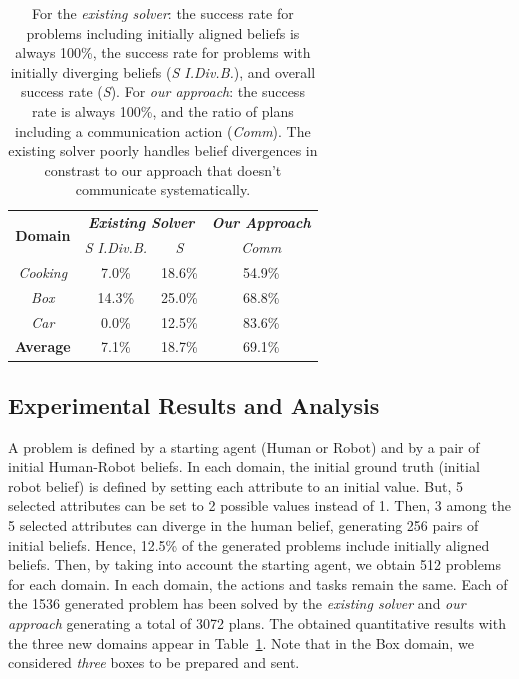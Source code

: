 \documentclass[letterpaper]{article} %
\begin{document}
\begin{table}
    \begin{adjustbox}{width=0.77\columnwidth,center}
    \begin{tabular}{@{}c|c c| c@{}}
        \multirow{2}{*}{\textbf{Domain}} & \multicolumn{2}{c|}{\textbf{\textit{Existing Solver}}} & \multicolumn{1}{c}{\textbf{\textit{Our Approach}}}
        \\
        & \multicolumn{1}{c}{\textit{S I.Div.B.}} & \multicolumn{1}{c|}{\textit{S}} & \multicolumn{1}{c}{\textit{Comm}} 
        \\ \cline{1-4}
        \textit{Cooking}    &  7.0\% & 18.6\% & 54.9\%\\
        \textit{Box}        & 14.3\% & 25.0\% & 68.8\%\\
        \textit{Car}        &  0.0\% & 12.5\% & 83.6\%\\
        \hline
        \textbf{Average}    &  7.1\% & 18.7\% & 69.1\%\\
    \end{tabular}
    \end{adjustbox}
    \caption
    {
    \label{tab:q_results}
    For the \textit{existing solver}: the success rate for problems including initially aligned beliefs is always 100\%, the success rate for problems with initially diverging beliefs (\textit{S I.Div.B.}), and overall success rate (\textit{S}). For \textit{our approach}: the success rate is always 100\%, and the ratio of plans including a communication action (\textit{Comm}). 
    The existing solver poorly handles belief divergences in constrast to our approach that doesn't communicate systematically.
    }
\end{table}

\subsection{Experimental Results and Analysis}

A problem is defined by a starting agent (Human or Robot) and by a pair of initial Human-Robot beliefs. In each domain, the initial ground truth (initial robot belief) is defined by setting each attribute to an initial value. But, 5 selected attributes can be set to 2 possible values instead of 1. Then, 3 among the 5 selected attributes can diverge in the human belief, generating 256 pairs of initial beliefs. Hence, 12.5\% of the generated problems include initially aligned beliefs. Then, by taking into account the starting agent, we obtain 512 problems for each domain. In each domain, the actions and tasks remain the same. 
Each of the 1536 generated problem has been solved by the \textit{existing solver} and \textit{our approach} generating a total of 3072 plans. The obtained quantitative results with the three new domains appear in Table~\ref{tab:q_results}. Note that in the Box domain, we considered \textit{three} boxes to be prepared and sent. 
\end{document}
